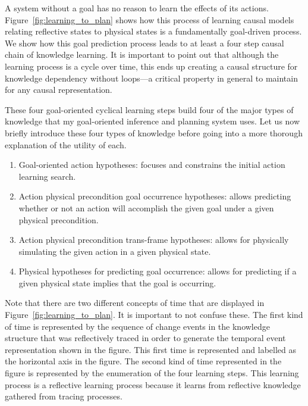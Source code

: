 A system without a goal has no reason to learn the effects of its
actions.  Figure~\ref{fig:learning_to_plan} shows how this process of
learning causal models relating reflective states to physical states
is a fundamentally goal-driven process.  We show how this goal
prediction process leads to at least a four step causal chain of
knowledge learning.  It is important to point out that although the
learning process is a cycle over time, this ends up creating a causal
structure for knowledge dependency without loops---a critical property
in general to maintain for any causal representation.

These four goal-oriented cyclical learning steps build four of the
major types of knowledge that my goal-oriented inference and planning
system uses.  Let us now briefly introduce these four types of
knowledge before going into a more thorough explanation of the utility
of each.

\begin{enumerate}

\item{Goal-oriented action hypotheses: focuses and constrains the
  initial action learning search.}

\item{Action physical precondition goal occurrence hypotheses: allows
  predicting whether or not an action will accomplish the given goal
  under a given physical precondition.}

\item{Action physical precondition trans-frame hypotheses: allows for
  physically simulating the given action in a given physical state.}

\item{Physical hypotheses for predicting goal occurrence: allows for
  predicting if a given physical state implies that the goal is
  occurring.}

\end{enumerate}

Note that there are two different concepts of time that are displayed
in Figure~\ref{fig:learning_to_plan}.  It is important to not confuse
these.  The first kind of time is represented by the sequence of
change events in the knowledge structure that was reflectively traced
in order to generate the temporal event representation shown in the
figure.  This first time is represented and labelled as the horizontal
axis in the figure.  The second kind of time represented in the figure
is represented by the enumeration of the four learning steps.  This
learning process is a reflective learning process because it learns
from reflective knowledge gathered from tracing processes.


